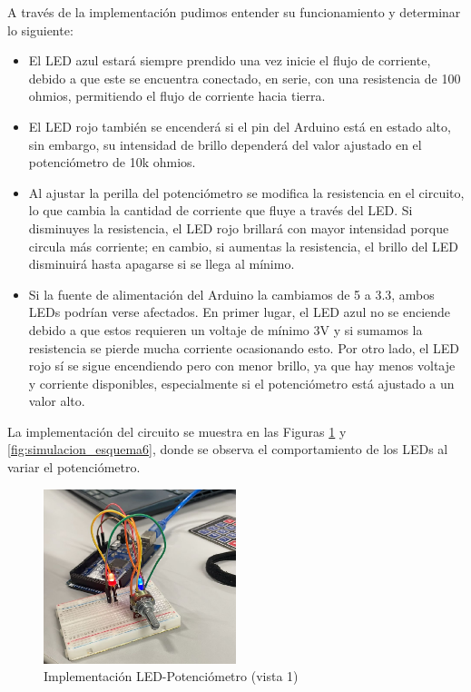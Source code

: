 \documentclass{article}
\begin{document}
A través de la implementación pudimos entender su funcionamiento y determinar lo siguiente:
\begin{itemize}
    \item El LED azul estará siempre prendido una vez inicie el flujo de corriente, debido a que este se encuentra conectado, en serie, con una resistencia de 100 ohmios, permitiendo el flujo de corriente hacia tierra.
    \item El LED rojo también se encenderá si el pin del Arduino está en estado alto, sin embargo, su intensidad de brillo dependerá del valor ajustado en el potenciómetro de 10k ohmios.
    \item Al ajustar la perilla del potenciómetro se modifica la resistencia en el circuito, lo que cambia la cantidad de corriente que fluye a través del LED. Si disminuyes la resistencia, el LED rojo brillará con mayor intensidad porque circula más corriente; en cambio, si aumentas la resistencia, el brillo del LED disminuirá hasta apagarse si se llega al mínimo.
    \item Si la fuente de alimentación del Arduino la cambiamos de 5 a 3.3, ambos LEDs podrían verse afectados. En primer lugar, el LED azul no se enciende debido a que estos requieren un voltaje de mínimo 3V y si sumamos la resistencia se pierde mucha corriente ocasionando esto. Por otro lado, el LED rojo sí se sigue encendiendo pero con menor brillo, ya que hay menos voltaje y corriente disponibles, especialmente si el potenciómetro está ajustado a un valor alto.
\end{itemize}

La implementación del circuito se muestra en las Figuras \ref{fig:simulacion_esquema5} y \ref{fig:simulacion_esquema6}, donde se observa el comportamiento de los LEDs al variar el potenciómetro.

\begin{figure}[H]
    \centering
    \includegraphics[width=0.50\textwidth]{./img/ckpt_3_4_2.png}
    \caption{Implementación LED-Potenciómetro (vista 1)}
    \label{fig:simulacion_esquema5}
\end{figure}
\end{document}
